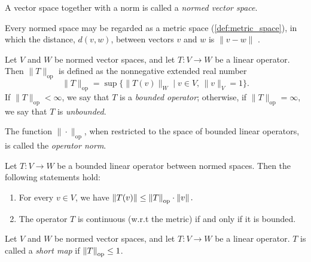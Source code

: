 \begin{definition} \label{def:normed_space}
A vector space together with a norm is called a \emph{normed vector space}.
\end{definition}


Every normed space may be regarded as a metric space (\autoref{def:metric_space}), in which the
distance, $d(v,w)$, between vectors $v$ and $w$ is $\|v-w\|$ .

\begin{definition} \label{def:op_norm}
Let \( V \) and \( W \) be normed vector spaces, and let \( T: V \to W \) be a linear operator. Then $\|T \|_{\text{op}}$ is defined as the nonnegative extended real number
\[
\|T\|_{\text{op}} = \sup \big\{ \|T(v)\|_W \mid v \in V, \, \|v\|_V = 1 \big\}.
\]
If \( \|T\|_{\text{op}} < \infty \), we say that \( T \) is a \emph{bounded operator}; otherwise, if \( \|T\|_{\text{op}} = \infty \), we say that \( T \) is \emph{unbounded}. 

The function \( \|\cdot\|_{\text{op}} \), when restricted to the space of bounded linear operators, is called the \emph{operator norm}.
\end{definition}

\begin{lemma} \cite[Lemma 6.4]{guide2006infinite} \label{lemma:op_norm_submult} %
Let \( T: V \rightarrow W \) be a bounded linear operator between normed spaces. Then the following statements hold:
\begin{enumerate}
  \item For every \( v \in V \), we have \( 
  \left\lVert T(v) \right\rVert \leq \left\lVert T \right\rVert_{\text{op}} \cdot \left\lVert v \right\rVert.\)
  \item The operator \( T \) is continuous (w.r.t the metric) if and only if it is bounded.
\end{enumerate}
\end{lemma}




\begin{definition}
  Let \( V \) and \( W \) be normed vector spaces, and let \( T: V \rightarrow W \) be a linear operator. $T$ is called a \emph{short map} if $\left\lVert T \right\rVert_{\text{op}} \leq 1$.
\end{definition}





